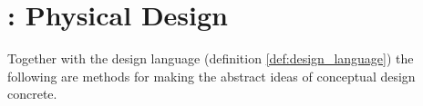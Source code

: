 \section{\todo : Physical Design} \label{sec:physical_design}
Together with the design language (definition \ref{def:design_language}) the following are methods for making the abstract ideas of conceptual design concrete.


